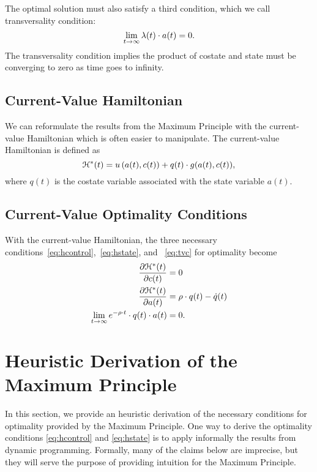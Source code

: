\documentclass[letterpaper,12pt,leqno]{article}
\begin{document}
The optimal solution must also satisfy a third condition, which we call transversality condition:
\begin{equation}
\lim_{t\to \infty }\lambda(t)\cdot a(t)=0.  \label{eq:tvc}
\end{equation}
The transversality condition implies the product of costate and state must be converging to zero as time goes to infinity.

\subsection{Current-Value Hamiltonian}

We can reformulate the results from the Maximum Principle with the current-value Hamiltonian which is often easier to manipulate. The current-value Hamiltonian is defined as 
\begin{equation*}
\mathcal{H}^{*}(t)=  u\left( a(t),c(t) \right) +q(t)\cdot g(a(t),c(t)),
\end{equation*}
where $q(t)$ is the costate variable associated with the state variable $a(t)$.

\subsection{Current-Value Optimality Conditions}

With the current-value Hamiltonian, the three necessary conditions~\eqref{eq:hcontrol},~\eqref{eq:hstate}, and ~\eqref{eq:tvc} for optimality become
\begin{align*}
\frac{\partial \mathcal{H}^{*}(t)}{\partial c(t)} &=0\\
\frac{\partial \mathcal{H}^{*}(t)}{\partial a(t)} &=\rho\cdot q(t)-\dot{q}(t)\\
\lim_{t\to \infty }e^{-\rho\cdot  t}\cdot q(t)\cdot a(t)&=0. 
\end{align*}


\section{Heuristic Derivation of the Maximum Principle}\label{sec:HEURISTIC}

In this section, we provide an heuristic derivation of the necessary conditions for optimality provided by the Maximum Principle. One way to derive the optimality conditions \eqref{eq:hcontrol} and \eqref{eq:hstate} is to apply informally the results from dynamic programming. Formally, many of the claims below are imprecise, but they will serve the purpose of providing intuition for the Maximum Principle.
\end{document}

